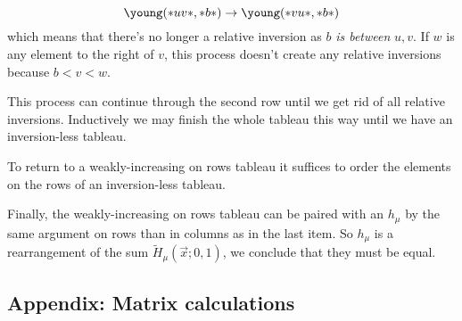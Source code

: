 \documentclass[12pt]{memoir}
\begin{document}
\begin{ptcbr}
\begin{itemize}
        $$\young(\ast uv\ast,\ast b\ast)\to\young(\ast vu\ast,\ast b\ast)$$
        which means that there's no longer a relative inversion as $b$ \emph{is between} $u,v$. If $w$ is any element to the right of $v$, this process doesn't create any relative inversions because $b<v<w$.\par 
        This process can continue through the second row until we get rid of all relative inversions. Inductively we may finish the whole tableau this way until we have an inversion-less tableau.\par 
        To return to a weakly-increasing on rows tableau it suffices to order the elements on the rows of an inversion-less tableau.\par 
        Finally, the weakly-increasing on rows tableau can be paired with an $h_\mu$ by the same argument on rows than in columns as in the last item. So $h_\mu$ is a rearrangement of the sum $\tilde{H}_\mu(\vec{x};0,1)$, we conclude that they must be equal.
    \end{itemize}
\end{ptcbr}
\newpage
\subsection*{Appendix: Matrix calculations}
\end{document}
